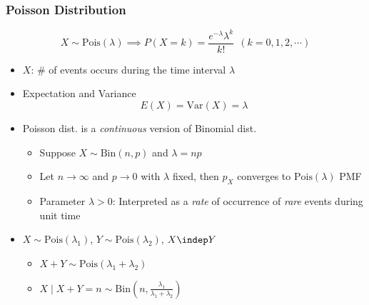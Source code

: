 \subsubsection*{Poisson Distribution}
\begin{equation}
    X\sim\text{Pois}(\lambda)\implies P(X=k)=\frac{e^{-\lambda}\lambda^k}{k!}~~(k=0,1,2,\cdots)
\end{equation}
\begin{itemize}
    \item $X$: \# of events occurs during the time interval $\lambda$
    \item Expectation and Variance
    \begin{equation}
        E(X)=\text{Var}(X)=\lambda
    \end{equation}
    \item Poisson dist. is a \textit{continuous} version of Binomial dist.
    \begin{itemize}
        \item Suppose $X\sim\text{Bin}(n,p)$ and $\lambda=np$
        \item Let $n\to\infty$ and $p\to 0$ with $\lambda$ fixed, then $p_X$ converges to $\text{Pois}(\lambda)$ PMF
        \item Parameter $\lambda>0$: Interpreted as a \textit{rate} of occurrence of \textit{rare} events during unit time
    \end{itemize}
    \item $X\sim\text{Pois}(\lambda_1)$, $Y\sim\text{Pois}(\lambda_2)$, $X\indep Y$
    \begin{itemize}
        \item $X+Y\sim\text{Pois}(\lambda_1+\lambda_2)$
        \item $X\mid X+Y=n\sim\text{Bin}\left(n,\frac{\lambda_1}{\lambda_1+\lambda_2}\right)$
    \end{itemize}
\end{itemize}

